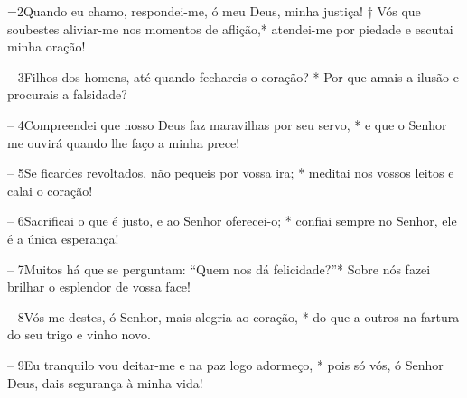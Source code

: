 =2Quando eu chamo, respondei-me, ó meu Deus, minha justiça! † 
Vós que soubestes aliviar-me nos momentos de aflição,* 
atendei-me por piedade e escutai minha oração! 

– 3Filhos dos homens, até quando fechareis o coração? * 
Por que amais a ilusão e procurais a falsidade? 

– 4Compreendei que nosso Deus faz maravilhas por seu servo, * 
e que o Senhor me ouvirá quando lhe faço a minha prece! 

– 5Se ficardes revoltados, não pequeis por vossa ira; * 
meditai nos vossos leitos e calai o coração! 

– 6Sacrificai o que é justo, e ao Senhor oferecei-o; * 
confiai sempre no Senhor, ele é a única esperança! 

– 7Muitos há que se perguntam: “Quem nos dá felicidade?”* 
Sobre nós fazei brilhar o esplendor de vossa face! 

– 8Vós me destes, ó Senhor, mais alegria ao coração, * 
do que a outros na fartura do seu trigo e vinho novo. 

– 9Eu tranquilo vou deitar-me e na paz logo adormeço, * 
pois só vós, ó Senhor Deus, dais segurança à minha vida!